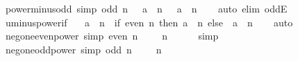\begin{isabellebody}
{\isafoldproof}%
%
\isadelimproof
\isanewline
%
\endisadelimproof
\isanewline
{}\isamarkupfalse%
\ power{\isacharunderscore}{\kern0pt}minus{\isacharunderscore}{\kern0pt}odd\ {\isacharbrackleft}{\kern0pt}simp{\isacharbrackright}{\kern0pt}{\isacharcolon}{\kern0pt}\ {\isachardoublequoteopen}odd\ n\ {\isasymLongrightarrow}\ {\isacharparenleft}{\kern0pt}{\isacharminus}{\kern0pt}\ a{\isacharparenright}{\kern0pt}\ {\isacharcircum}{\kern0pt}\ n\ {\isacharequal}{\kern0pt}\ {\isacharminus}{\kern0pt}\ {\isacharparenleft}{\kern0pt}a\ {\isacharcircum}{\kern0pt}\ n{\isacharparenright}{\kern0pt}{\isachardoublequoteclose}\isanewline
%
\isadelimproof
\ \ %
\endisadelimproof
%
\isatagproof
{}\isamarkupfalse%
\ {\isacharparenleft}{\kern0pt}auto\ elim{\isacharcolon}{\kern0pt}\ oddE{\isacharparenright}{\kern0pt}%
\endisatagproof
{\isafoldproof}%
%
\isadelimproof
\isanewline
%
\endisadelimproof
\isanewline
{}\isamarkupfalse%
\ uminus{\isacharunderscore}{\kern0pt}power{\isacharunderscore}{\kern0pt}if{\isacharcolon}{\kern0pt}\isanewline
\ \ {\isachardoublequoteopen}{\isacharparenleft}{\kern0pt}{\isacharminus}{\kern0pt}\ a{\isacharparenright}{\kern0pt}\ {\isacharcircum}{\kern0pt}\ n\ {\isacharequal}{\kern0pt}\ {\isacharparenleft}{\kern0pt}if\ even\ n\ then\ a\ {\isacharcircum}{\kern0pt}\ n\ else\ {\isacharminus}{\kern0pt}\ {\isacharparenleft}{\kern0pt}a\ {\isacharcircum}{\kern0pt}\ n{\isacharparenright}{\kern0pt}{\isacharparenright}{\kern0pt}{\isachardoublequoteclose}\isanewline
%
\isadelimproof
\ \ %
\endisadelimproof
%
\isatagproof
{}\isamarkupfalse%
\ auto%
\endisatagproof
{\isafoldproof}%
%
\isadelimproof
\isanewline
%
\endisadelimproof
\isanewline
{}\isamarkupfalse%
\ neg{\isacharunderscore}{\kern0pt}one{\isacharunderscore}{\kern0pt}even{\isacharunderscore}{\kern0pt}power\ {\isacharbrackleft}{\kern0pt}simp{\isacharbrackright}{\kern0pt}{\isacharcolon}{\kern0pt}\ {\isachardoublequoteopen}even\ n\ {\isasymLongrightarrow}\ {\isacharparenleft}{\kern0pt}{\isacharminus}{\kern0pt}\ {}{\isacharparenright}{\kern0pt}\ {\isacharcircum}{\kern0pt}\ n\ {\isacharequal}{\kern0pt}\ {}{\isachardoublequoteclose}\isanewline
%
\isadelimproof
\ \ %
\endisadelimproof
%
\isatagproof
{}\isamarkupfalse%
\ simp%
\endisatagproof
{\isafoldproof}%
%
\isadelimproof
\isanewline
%
\endisadelimproof
\isanewline
{}\isamarkupfalse%
\ neg{\isacharunderscore}{\kern0pt}one{\isacharunderscore}{\kern0pt}odd{\isacharunderscore}{\kern0pt}power\ {\isacharbrackleft}{\kern0pt}simp{\isacharbrackright}{\kern0pt}{\isacharcolon}{\kern0pt}\ {\isachardoublequoteopen}odd\ n\ {\isasymLongrightarrow}\ {\isacharparenleft}{\kern0pt}{\isacharminus}{\kern0pt}\ {}{\isacharparenright}{\kern0pt}\ {\isacharcircum}{\kern0pt}\ n\ {\isacharequal}{\kern0pt}\ {\isacharminus}{\kern0pt}\ {}{\isachardoublequoteclose}\isanewline

\end{isabellebody}
